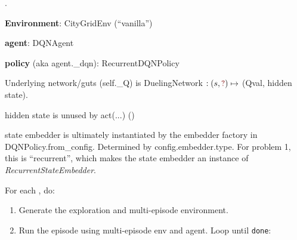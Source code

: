\documentclass[11pt]{article}
\begin{document}
. 

\begin{compactitem}
	\item \textbf{Environment}: CityGridEnv (``vanilla'')
	\item \textbf{agent}: DQNAgent
	\begin{compactitem}
		\item \textbf{policy} (aka agent.\_dqn): RecurrentDQNPolicy
		\item Underlying network/guts (self.\_Q) is DuelingNetwork $ : (s, \mred{?}) \mapsto$ (Qval, hidden state).
		\begin{compactitem}
			\item hidden state is unused by act(...) ()
			\item state embedder is ultimately instantiated by the embedder factory in DQNPolicy.from\_config. Determined by config.embedder.type. For problem 1, this is ``recurrent'', which makes the state embedder an instance of \textit{RecurrentStateEmbedder}.
		\end{compactitem} 
	\end{compactitem}
	
\end{compactitem}

For each , do:
\begin{enumerate}
	\item Generate the exploration and multi-episode environment. 
	
	
	
	\item Run the episode using multi-episode env and agent. Loop until \texttt{done}:
\end{enumerate}
\end{document}
